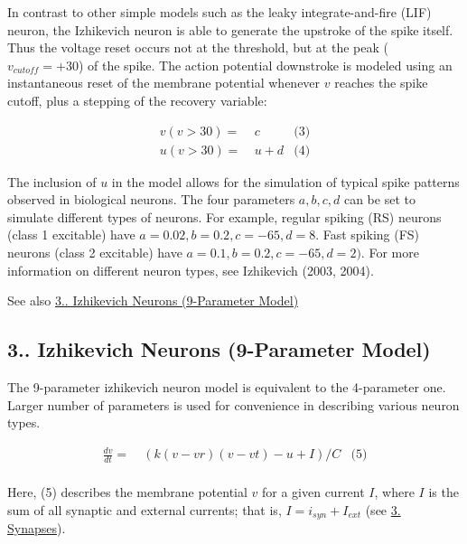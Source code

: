 In contrast to other simple models such as the leaky integrate-\/and-\/fire (L\+IF) neuron, the Izhikevich neuron is able to generate the upstroke of the spike itself. Thus the voltage reset occurs not at the threshold, but at the peak ( $v_{cutoff}=+30$) of the spike. The action potential downstroke is modeled using an instantaneous reset of the membrane potential whenever $v$ reaches the spike cutoff, plus a stepping of the recovery variable\+:

\begin{align*} v(v>30) = & ~ c & \text{(3)}\\ u(v>30) = & ~ u + d & \text{(4)}\end{align*}

The inclusion of $u$ in the model allows for the simulation of typical spike patterns observed in biological neurons. The four parameters $a, b, c, d$ can be set to simulate different types of neurons. For example, regular spiking (RS) neurons (class 1 excitable) have $a=0.02, b=0.2, c=-65, d=8$. Fast spiking (FS) neurons (class 2 excitable) have $a=0.1, b=0.2, c=-65, d=2)$. For more information on different neuron types, see Izhikevich (2003, 2004).

\begin{DoxySeeAlso}{See also}
\hyperlink{ch3_neurons_synapses_groups_ch3s1s2_izhikevich_neurons9}{3.. Izhikevich Neurons (9-\/\+Parameter Model)}
\end{DoxySeeAlso}
\hypertarget{ch3_neurons_synapses_groups_ch3s1s2_izhikevich_neurons9}{}\subsection{3.. Izhikevich Neurons (9-\/\+Parameter Model)}\label{ch3_neurons_synapses_groups_ch3s1s2_izhikevich_neurons9}
The 9-\/parameter izhikevich neuron model is equivalent to the 4-\/parameter one. Larger number of parameters is used for convenience in describing various neuron types.

\begin{align*} \frac{dv}{dt} = & ~ (k (v - vr) (v - vt) - u + I) / C & \text{(5)}\\ \end{align*}

Here, (5) describes the membrane potential $v$ for a given current $I$, where $I$ is the sum of all synaptic and external currents; that is, $I = i_{syn} + I_{ext}$ (see \hyperlink{ch3_neurons_synapses_groups_ch3s2_synapses}{3. Synapses}).

